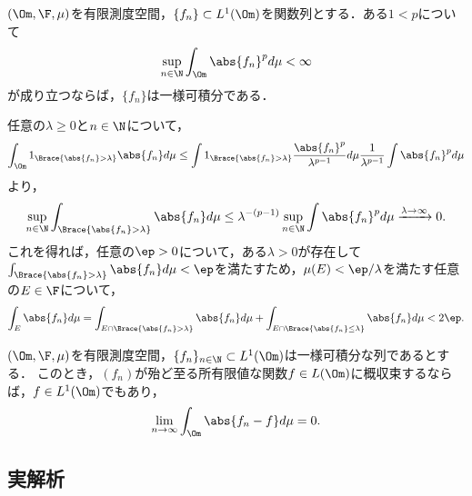 \documentclass[uplatex,dvipdfmx]{jsarticle}
\begin{document}
\begin{proposition}
    $(\Om,\F,\mu)$を有限測度空間，$\{f_n\}\subset L^1(\Om)$を関数列とする．ある$1<p$について
    \[\sup_{n\in\N}\int_\Om\abs{f_n}^pd\mu<\infty\]
    が成り立つならば，$\{f_n\}$は一様可積分である．
\end{proposition}
\begin{Proof}
    任意の$\lambda\ge 0$と$n\in\N$について，
    \[\int_\Om 1_{\Brace{\abs{f_n}>\lambda}}\abs{f_n}d\mu\le\int1_{\Brace{\abs{f_n}>\lambda}}\frac{\abs{f_n}^p}{\lambda^{p-1}}d\mu\frac{1}{\lambda^{p-1}}\int\abs{f_n}^pd\mu\]
    より，
    \[\sup_{n\in\N}\int_{\Brace{\abs{f_n}>\lambda}}\abs{f_n}d\mu\le\lambda^{-(p-1)}\sup_{n\in\N}\int\abs{f_n}^pd\mu\xrightarrow{\lambda\to\infty}0.\]
    これを得れば，任意の$\ep>0$について，ある$\lambda>0$が存在して$\int_{\Brace{\abs{f_n}>\lambda}}\abs{f_n}d\mu<\ep$を満たすため，$\mu(E)<\ep/\lambda$を満たす任意の$E\in\F$について，
    \[\int_E\abs{f_n}d\mu=\int_{E\cap\Brace{\abs{f_n}>\lambda}}\abs{f_n}d\mu+\int_{E\cap\Brace{\abs{f_n}\le\lambda}}\abs{f_n}d\mu<2\ep.\]
\end{Proof}

\begin{theorem}[Vitali]
    $(\Om,\F,\mu)$を有限測度空間，$\{f_n\}_{n\in\N}\subset L^1(\Om)$は一様可積分な列であるとする．
    このとき，$(f_n)$が殆ど至る所有限値な関数$f\in L(\Om)$に概収束するならば，$f\in L^1(\Om)$でもあり，
    \[\lim_{n\to\infty}\int_\Om\abs{f_n-f}d\mu=0.\]
\end{theorem}

\subsection{実解析}
\end{document}
